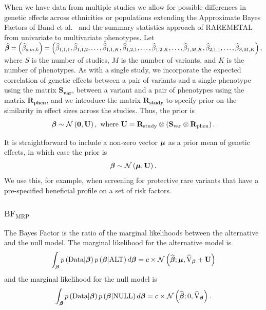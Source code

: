 When we have data from multiple studies 
we allow for possible differences in genetic effects across ethnicities or populations 
extending the Approximate Bayes Factors of Band et al.~\cite{band2013imputation}
and the summary statistics approach of RAREMETAL~\cite{liu2014meta} from univariate to multivariate phenotypes.
Let $\boldsymbol {\widehat{ \beta}} = \left(\widehat{ \beta}_{s,m,k}\right)=\left(\widehat{\beta}_{1,1,1}, \widehat{\beta}_{1,1,2}, \dots, \widehat{\beta}_{1,1,K}, \widehat{\beta}_{1,2,1}, \dots, \widehat{\beta}_{1,2,K}, \dots, \widehat{\beta}_{1,M,K}, \widehat{\beta}_{2,1,1}, \dots, \widehat{\beta}_{S,M,K}\right),$ where $S$ is the number of studies, $M$ is the number of variants, and $K$ is the number of phenotypes. 
As with a single study, we incorporate the expected correlation of genetic effects between a pair of variants and a single phenotype using the matrix $\mathbf{S_{\textrm{var}}}$, between a variant and a pair of phenotypes using the matrix $\mathbf{R_{\textrm{phen}}}$, and we introduce the matrix $\mathbf{R_{\textrm{study}}}$ to specify prior on the similarity in effect sizes across the studies.
Thus, the prior is
$${\boldsymbol {\beta}} \sim \mathcal{N}\left(\mathbf{0}, \mathbf{U}\right), \textrm{ where } 
\mathbf{U} = \mathbf{R}_{\textrm{study}}\otimes\left(\mathbf{S}_{\textrm{var}} \otimes \mathbf{R}_{\textrm{phen}}\right).$$

It is straightforward to include a non-zero vector ${\boldsymbol\mu}$ as a prior mean of genetic effects, in which case the prior is
$${\boldsymbol {\beta}} \sim \mathcal{N}\left({\boldsymbol \mu},\mathbf{U}\right).$$
We use this, for example, when screening for protective rare variants that have a pre-specified beneficial profile on a set of risk factors.


\subsubsection*{$\textrm{BF}_{\textrm{MRP}}$} 
\label{bfmodel}
The Bayes Factor is the ratio of the marginal likelihoods between the alternative and the null model. 
The marginal likelihood for the alternative model is 
$$ \int_{{\boldsymbol {\beta}}} p\left(\mathbf{\textrm{Data}}|{\boldsymbol {\beta}}\right) p\left({\boldsymbol {\beta}}|\textrm{ALT}\right)d{\boldsymbol {\beta}} = c \times \mathcal{N}\left({ {\widehat{\boldsymbol \beta}}}; {\boldsymbol \mu},  \widehat{\mathbf{\textrm{V}}}_{{\boldsymbol {\beta}}} + \mathbf{U}\right)$$
and the marginal likelihood for the null model is 
$$\int_{{\boldsymbol {\beta}}} p\left(\mathbf{\textrm{Data}}|{\boldsymbol {\beta}}\right) p\left({\boldsymbol {\beta}}|\textrm{NULL}\right)d{\boldsymbol {\beta}} = c \times \mathcal{N}\left({ {\widehat{\boldsymbol \beta}}}; 0,  \widehat{\mathbf{\textrm{V}}}_{{\boldsymbol {\beta}}}\right).$$

